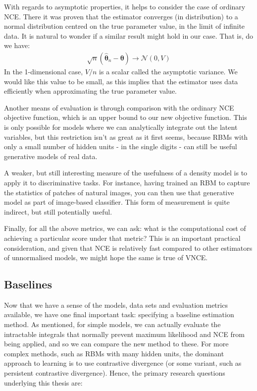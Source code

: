 \documentclass[11pt, oneside]{article}
\newcommand{\thetab}{{\boldsymbol{\theta}}}
\newcommand{\thetaHat}{{\hat{\thetab}}}
\theoremstyle{definition}
\begin{document}
With regards to asymptotic properties, it helps to consider the case of ordinary NCE. There it was proven that the estimator converges (in distribution) to a normal distribution centred on the true parameter value, in the limit of infinite data. It is natural to wonder if a similar result might hold in our case. That is, do we have:
\begin{align}
    \sqrt{n} (\thetaHat_n - \thetab) \rightarrow \mathcal{N}(0, V)
\end{align}
In the 1-dimensional case, $V/n$ is a scalar called the asymptotic variance. We would like this value to be small, as this implies that the estimator uses data efficiently when approximating the true parameter value.

Another means of evaluation is through comparison with the ordinary NCE objective function, which is an upper bound to our new objective function. This is only possible for models where we can analytically integrate out the latent variables, but this restriction isn't as great as it first seems, because RBMs with only a small number of hidden units - in the single digits - can still be useful generative models of real data.

A weaker, but still interesting measure of the usefulness of a density model is to apply it to discriminative tasks. For instance, having trained an RBM to capture the statistics of patches of natural images, you can then use that generative model as part of image-based classifier. This form of measurement is quite indirect, but still potentially useful. 

Finally, for all the above metrics, we can ask: what is the computational cost of achieving a particular score under that metric? This is an important practical consideration, and given that NCE is relatively fast compared to other estimators of unnormalised models, we might hope the same is true of VNCE.

\subsection{Baselines}
\label{sec: baselines}
Now that we have a sense of the models, data sets and evaluation metrics available, we have one final important task: specifying a baseline estimation method. As mentioned, for simple models, we can actually evaluate the intractable integrals that normally prevent maximum likelihood and NCE from being applied, and so we can compare the new method to these. For more complex methods, such as RBMs with many hidden units, the dominant approach to learning is to use contrastive divergence (or some variant, such as persistent contrastive divergence). Hence, the primary research questions underlying this thesis are: 
\end{document}

